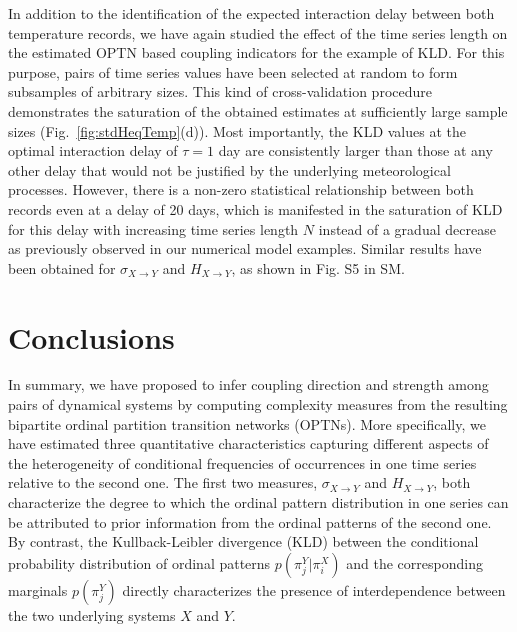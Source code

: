 \documentclass[12pt,aip,cha,reprint,nofootinbib]{revtex4-1}
\begin{document}
In addition to the identification of the expected interaction delay between both temperature records, we have again studied the effect of the time series length on the estimated OPTN based coupling indicators for the example of KLD. For this purpose, pairs of time series values have been selected at random to form subsamples of arbitrary sizes. This kind of cross-validation procedure demonstrates the saturation of the obtained estimates at sufficiently large sample sizes (Fig.~\ref{fig:stdHeqTemp}(d)). Most importantly, the KLD values at the optimal interaction delay of $\tau=1$ day are consistently larger than those at any other delay that would not be justified by the underlying meteorological processes. However, there is a non-zero statistical relationship between both records even at a delay of 20 days, which is manifested in the saturation of KLD for this delay with increasing time series length $N$ instead of a gradual decrease as previously observed in our numerical model examples. {\color{red}Similar results have been obtained for $\sigma_{X\to Y}$ and $H_{X\to Y}$, as shown in Fig. S5 in SM. }

\section{Conclusions} \label{sec:con}

In summary, we have proposed to infer coupling direction and strength among pairs of dynamical systems by computing complexity measures from the resulting bipartite ordinal {\color{red}partition} transition networks (OPTNs). More specifically, we have estimated three quantitative characteristics capturing different aspects of the heterogeneity of conditional frequencies of occurrences in one time series relative to the second one. The first two measures, $\sigma_{X\to Y}$ and $H_{X\to Y}$, both characterize the degree to which the ordinal pattern distribution in one series can be attributed to prior information from the ordinal patterns of the second one. By contrast, the Kullback-Leibler divergence (KLD) between the conditional probability distribution of ordinal patterns $p(\pi_{j}^{Y} | \pi_i^{X})$ and the corresponding marginals $p(\pi_j^{Y})$ directly characterizes the presence of interdependence between the two underlying systems $X$ and $Y$. 
\end{document}
